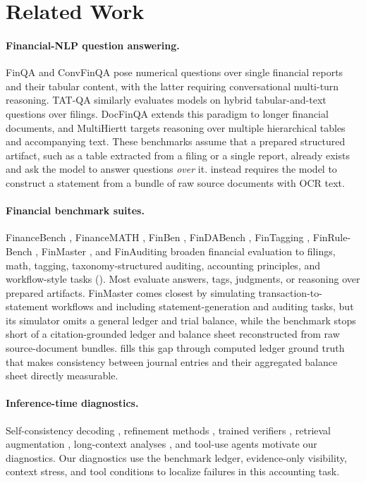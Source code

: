 \section{Related Work}
\label{sec:related}

\paragraph{Financial-NLP question answering.}
FinQA \citep{chen-etal-2021-finqa} and ConvFinQA \citep{chen-etal-2022-convfinqa} pose numerical questions over single financial reports and their tabular content, with the latter requiring conversational multi-turn reasoning. TAT-QA \citep{zhu-etal-2021-tatqa} similarly evaluates models on hybrid tabular-and-text questions over filings. DocFinQA \citep{reddy-etal-2024-docfinqa} extends this paradigm to longer financial documents, and MultiHiertt \citep{zhao-etal-2022-multihiertt} targets reasoning over multiple hierarchical tables and accompanying text. These benchmarks assume that a prepared structured artifact, such as a table extracted from a filing or a single report, already exists and ask the model to answer questions \emph{over} it. \benchmark{} instead requires the model to construct a statement from a bundle of raw source documents with OCR text.

\paragraph{Financial benchmark suites.}
FinanceBench \citep{islam2023financebench}, FinanceMATH \citep{zhao-etal-2024-financemath}, FinBen \citep{xie2024finben}, FinDABench \citep{liu-etal-2025-findabench}, FinTagging \citep{wang2025fintagging}, FinRule-Bench \citep{malarkkan2026finrulebench}, FinMaster \citep{jiang2025finmaster}, and FinAuditing \citep{wang2026finauditing} broaden financial evaluation to filings, math, tagging, taxonomy-structured auditing, accounting principles, and workflow-style tasks (). Most evaluate answers, tags, judgments, or reasoning over prepared artifacts. FinMaster comes closest by simulating transaction-to-statement workflows and including statement-generation and auditing tasks, but its simulator omits a general ledger and trial balance, while the benchmark stops short of a citation-grounded ledger and balance sheet reconstructed from raw source-document bundles. \benchmark{} fills this gap through computed ledger ground truth that makes consistency between journal entries and their aggregated balance sheet directly measurable.

\paragraph{Inference-time diagnostics.}
Self-consistency decoding \citep{wang2023selfconsistency}, refinement methods \citep{madaan2023selfrefine,shinn2023reflexion}, trained verifiers \citep{cobbe2021gsm8k,lightman2024verify}, retrieval augmentation \citep{lewis2020rag}, long-context analyses \citep{liu2024lostmiddle}, and tool-use agents \citep{yao2023react} motivate our diagnostics. Our diagnostics use the benchmark ledger, evidence-only visibility, context stress, and tool conditions to localize failures in this accounting task.
